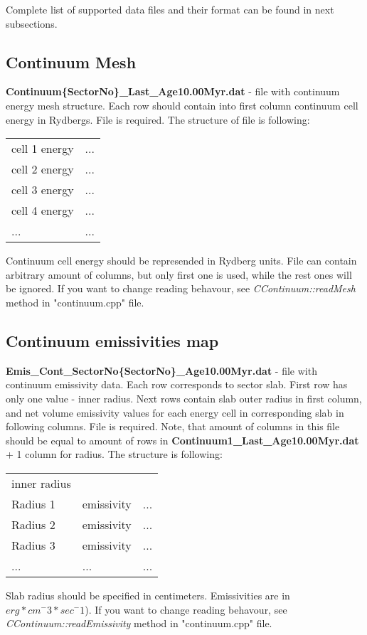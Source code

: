\documentclass[a4paper]{article}
\begin{document}
Complete list of supported data files and their format can be found in next subsections.

\subsection{Continuum Mesh}
{\bf Continuum\{SectorNo\}\_Last\_Age10.00Myr.dat} - file with continuum energy mesh structure.
Each row should contain into first column continuum cell energy in Rydbergs. 
File is required. The structure of file is following:
\begin{table}[H]
\begin{tabular}{ll}
cell 1 energy & ... \\
cell 2 energy & ... \\
cell 3 energy & ... \\
cell 4 energy & ... \\
... & ... \\
\end{tabular}
\end{table}
Continuum cell energy should be represended in Rydberg units. File can contain arbitrary amount of columns, but only first one is used,
while the rest ones will be ignored.
If you want to change reading behavour, see {\it CContinuum::readMesh} method in "continuum.cpp" file.

\subsection{Continuum emissivities map}
{\bf Emis\_Cont\_SectorNo\{SectorNo\}\_Age10.00Myr.dat} - file with continuum emissivity data. Each row
corresponds to sector slab. First row has only one value - inner radius. Next rows contain slab outer radius in first column, 
and net volume emissivity values for each energy cell in corresponding slab in following columns. File is required. Note, that amount of columns in this file should
be equal to amount of rows in {\bf Continuum1\_Last\_Age10.00Myr.dat} + 1 column for radius.
The structure is following:
\begin{table}[H]
    \begin{tabular}{lll}
        inner radius & & \\
        Radius 1 & emissivity & ... \\
        Radius 2 & emissivity & ... \\
        Radius 3 & emissivity & ... \\
        ... & ... & ... \\
    \end{tabular}
\end{table}
Slab radius should be specified in centimeters. Emissivities are in $erg * cm^-3 * sec^-1$).
If you want to change reading behavour, see {\it CContinuum::readEmissivity} method in "continuum.cpp" file.
\end{document}
